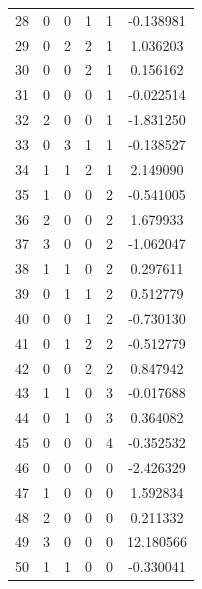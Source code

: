 \documentclass[preprint,12pt]{elsarticle}
\begin{document}
\begin{table}
\begin{minipage}[h!]{0.23\textwidth}
{\begin{tabular}{|c|ccccc|}
28 &   0 &   0 &   1 &   1 &  -0.138981 \\
29 &   0 &   2 &   2 &   1 &   1.036203 \\
30 &   0 &   0 &   2 &   1 &   0.156162 \\
31 &   0 &   0 &   0 &   1 &  -0.022514 \\
32 &   2 &   0 &   0 &   1 &  -1.831250 \\
33 &   0 &   3 &   1 &   1 &  -0.138527 \\
34 &   1 &   1 &   2 &   1 &   2.149090 \\
35 &   1 &   0 &   0 &   2 &  -0.541005 \\
36 &   2 &   0 &   0 &   2 &   1.679933 \\
37 &   3 &   0 &   0 &   2 &  -1.062047 \\
38 &   1 &   1 &   0 &   2 &   0.297611 \\
39 &   0 &   1 &   1 &   2 &   0.512779 \\
40 &   0 &   0 &   1 &   2 &  -0.730130 \\
41 &   0 &   1 &   2 &   2 &  -0.512779 \\
42 &   0 &   0 &   2 &   2 &   0.847942 \\
43 &   1 &   1 &   0 &   3 &  -0.017688 \\
44 &   0 &   1 &   0 &   3 &   0.364082 \\
45 &   0 &   0 &   0 &   4 &  -0.352532 \\
46 &   0 &   0 &   0 &   0 &  -2.426329 \\
47 &   1 &   0 &   0 &   0 &   1.592834 \\
48 &   2 &   0 &   0 &   0 &   0.211332 \\
49 &   3 &   0 &   0 &   0 &  12.180566 \\
50 &   1 &   1 &   0 &   0 &  -0.330041
\end{tabular}}
\end{minipage}%
%
\begin{minipage}[h!]{0.23\textwidth}
\end{minipage}
\end{table}
\end{document}
